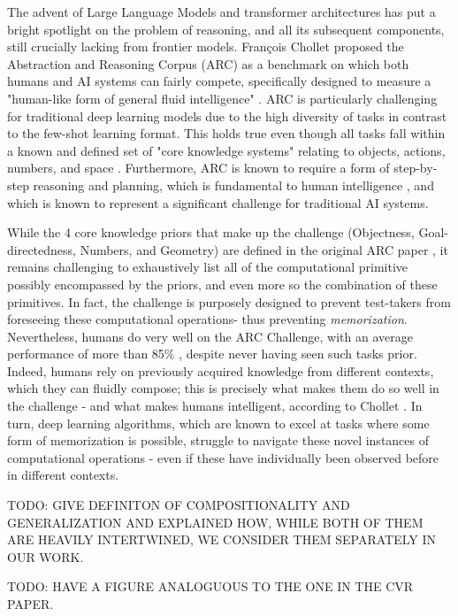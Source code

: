 The advent of Large Language Models and transformer architectures has put a bright spotlight on the problem of reasoning, and all its subsequent components, still crucially lacking from frontier models. 
%
François Chollet proposed the Abstraction and Reasoning Corpus (ARC) as a benchmark on which both humans and AI systems can fairly compete, specifically designed to measure a "human-like form of general fluid intelligence" \cite{cholletARC}. ARC is particularly challenging for traditional deep learning models due to the high diversity of tasks in contrast to the few-shot learning format. This holds true even though all tasks fall within a known and defined set of "core knowledge systems" relating to objects, actions, numbers, and space \cite{cholletARC, CoreKnowledgePrinciples}. Furthermore, ARC is known to require a form of step-by-step reasoning and planning, which is fundamental to human intelligence \cite{simon1971human}, and which is known to represent a significant challenge for traditional AI systems.

While the 4 core knowledge priors that make up the challenge (Objectness, Goal-directedness, Numbers, and Geometry) are defined in the original ARC paper \cite{cholletARC}, it remains challenging to exhaustively list all of the computational primitive possibly encompassed by the priors, and even more so the combination of these primitives. In fact, the challenge is purposely designed to prevent test-takers from foreseeing these computational operations- thus preventing \textit{memorization}. Nevertheless, humans do very well on the ARC Challenge, with an average performance of more than 85\% \cite{galper2013status}, despite never having seen such tasks prior. Indeed, humans rely on previously acquired knowledge from different contexts, which they can fluidly compose; this is precisely what makes them do so well in the challenge - and what makes humans intelligent, according to Chollet \cite{cholletARC}. In turn, deep learning algorithms, which are known to excel at tasks where some form of memorization is possible, struggle to navigate these novel instances of computational operations - even if these have individually been observed before in different contexts. 

TODO: GIVE DEFINITON OF COMPOSITIONALITY AND GENERALIZATION AND EXPLAINED HOW, WHILE BOTH OF THEM ARE HEAVILY INTERTWINED, WE CONSIDER THEM SEPARATELY IN OUR WORK.

TODO: HAVE A FIGURE ANALOGUOUS TO THE ONE IN THE CVR PAPER.

